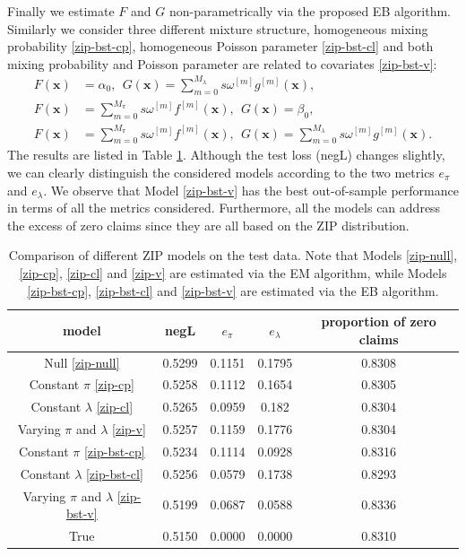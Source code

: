 \documentclass[11pt]{article}
\numberwithin{equation}{section}
\def\bx{\boldsymbol{x}}
\begin{document}
Finally we estimate $F$ and $G$ non-parametrically via the proposed EB algorithm. Similarly we consider three different mixture structure, homogeneous mixing probability \eqref{zip-bst-cp}, homogeneous Poisson parameter \eqref{zip-bst-cl} and both  mixing probability and Poisson parameter are related to covariates \eqref{zip-bst-v}: 
\begin{align}
	F(\bx)&=\alpha_0, ~~G(\bx)=\sum_{m=0}^{M_\lambda} s\omega^{[m]} g^{[m]}(\bx), \label{zip-bst-cp} \\
	F(\bx)&=\sum_{m=0}^{M_\pi} s\omega^{[m]} f^{[m]}(\bx), ~~G(\bx)=\beta_0, \label{zip-bst-cl} \\
	F(\bx)&=\sum_{m=0}^{M_\pi} s\omega^{[m]} f^{[m]}(\bx),  ~~G(\bx)=\sum_{m=0}^{M_\lambda} s\omega^{[m]} g^{[m]}(\bx). \label{zip-bst-v}
\end{align}  
The results are listed in Table \ref{zip}.
Although the test loss (negL) changes slightly, we can clearly distinguish the considered models according to the two metrics $e_\pi$ and $e_\lambda$.
We observe that Model \eqref{zip-bst-v} has the best out-of-sample performance in terms of all the metrics considered.
Furthermore, all the models can address the excess of zero claims since they are all based on the ZIP distribution.
\begin{table}[htp!]
			\caption{Comparison of different ZIP models on the test data. Note that Models \eqref{zip-null}, \eqref{zip-cp}, \eqref{zip-cl} and \eqref{zip-v} are estimated via the EM algorithm, while Models \eqref{zip-bst-cp}, \eqref{zip-bst-cl} and \eqref{zip-bst-v} are estimated via the EB algorithm.} \label{zip}
			\centering
	\begin{tabular}{ccccc}

		\hline
		model   & negL   & $e_\pi$ & $e_\lambda$ & proportion of zero claims \\ \hline
		Null \eqref{zip-null}    & 0.5299 & 0.1151     & 0.1795     & 0.8308        \\
		Constant $\pi$ \eqref{zip-cp} & 0.5258 & 0.1112     & 0.1654     & 0.8305        \\
		Constant $\lambda$ \eqref{zip-cl} & 0.5265 & 0.0959     & 0.182      & 0.8304        \\
		Varying $\pi$ and $\lambda$  \eqref{zip-v} & 0.5257 & 0.1159     & 0.1776     & 0.8304        \\
		Constant $\pi$  \eqref{zip-bst-cp} & 0.5234 & 0.1114     & 0.0928     & 0.8316        \\
		Constant $\lambda$   \eqref{zip-bst-cl} & 0.5256 & 0.0579     & 0.1738     & 0.8293        \\
		Varying $\pi$ and $\lambda$  \eqref{zip-bst-v}  & 0.5199 & 0.0687     & 0.0588     & 0.8336        \\
		True    & 0.5150  & 0.0000         & 0.0000         & 0.8310         \\ \hline
	\end{tabular}
\end{table}
\end{document}
